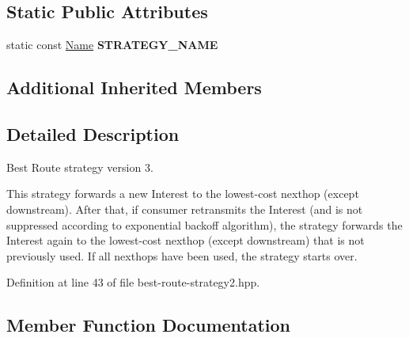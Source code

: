 \subsection*{Static Public Attributes}
\begin{DoxyCompactItemize}
\item 
static const \hyperlink{classndn_1_1Name}{Name} {\bfseries S\+T\+R\+A\+T\+E\+G\+Y\+\_\+\+N\+A\+ME}\hypertarget{classnfd_1_1fw_1_1BestRouteStrategy2_af43202e37b10ec19896d6a46946096a0}{}\label{classnfd_1_1fw_1_1BestRouteStrategy2_af43202e37b10ec19896d6a46946096a0}

\end{DoxyCompactItemize}
\subsection*{Additional Inherited Members}


\subsection{Detailed Description}
Best Route strategy version 3. 

This strategy forwards a new Interest to the lowest-\/cost nexthop (except downstream). After that, if consumer retransmits the Interest (and is not suppressed according to exponential backoff algorithm), the strategy forwards the Interest again to the lowest-\/cost nexthop (except downstream) that is not previously used. If all nexthops have been used, the strategy starts over. 

Definition at line 43 of file best-\/route-\/strategy2.\+hpp.



\subsection{Member Function Documentation}
